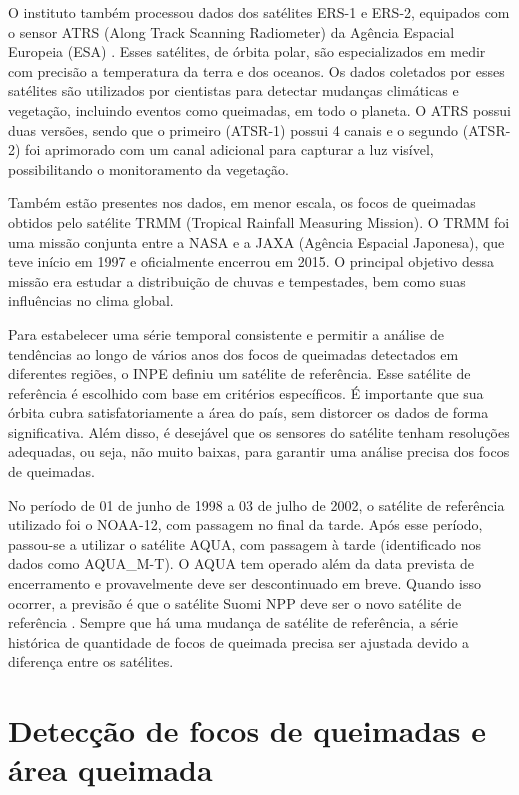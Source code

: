 \documentclass[cic,tc]{iiufrgs}
\begin{document}
O instituto também processou dados dos satélites ERS-1 e ERS-2, equipados com o sensor ATRS (Along Track Scanning Radiometer) da Agência Espacial Europeia (ESA) \cite{EmbrapaSatelites}. Esses satélites, de órbita polar, são especializados em medir com precisão a temperatura da terra e dos oceanos. Os dados coletados por esses satélites são utilizados por cientistas para detectar mudanças climáticas e vegetação, incluindo eventos como queimadas, em todo o planeta. O ATRS possui duas versões, sendo que o primeiro (ATSR-1) possui 4 canais e o segundo (ATSR-2) foi aprimorado com um canal adicional para capturar a luz visível, possibilitando o monitoramento da vegetação.  \par

Também estão presentes nos dados, em menor escala, os focos de queimadas obtidos pelo satélite TRMM (Tropical Rainfall Measuring Mission). O TRMM foi uma missão conjunta entre a NASA e a JAXA (Agência Espacial Japonesa), que teve início em 1997 e oficialmente encerrou em 2015. O principal objetivo dessa missão era estudar a distribuição de chuvas e tempestades, bem como suas influências no clima global. \par

Para estabelecer uma série temporal consistente e permitir a análise de tendências ao longo de vários anos dos focos de queimadas detectados em diferentes regiões, o INPE definiu um satélite de referência. Esse satélite de referência é escolhido com base em critérios específicos. É importante que sua órbita cubra satisfatoriamente a área do país, sem distorcer os dados de forma significativa. Além disso, é desejável que os sensores do satélite tenham resoluções adequadas, ou seja, não muito baixas, para garantir uma análise precisa dos focos de queimadas.

No período de 01 de junho de 1998 a 03 de julho de 2002, o satélite de referência utilizado foi o NOAA-12, com passagem no final da tarde. Após esse período, passou-se a utilizar o satélite AQUA, com passagem à tarde (identificado nos dados como AQUA\_M-T). O AQUA tem operado além da data prevista de encerramento e provavelmente deve ser descontinuado em breve. Quando isso ocorrer, a previsão é que o satélite Suomi NPP deve ser o novo satélite de referência \citep{PerguntasFrequentesINPE}. Sempre que há uma mudança de satélite de referência, a série histórica de quantidade de focos de queimada precisa ser ajustada devido a diferença entre os satélites.

\section{Detecção de focos de queimadas e área queimada}
\label{sec:deteccao_focos_section}
\end{document}
